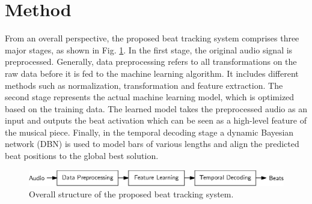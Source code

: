 \documentclass{scrartcl}
\begin{document}




\newpage


\section{Method}
\label{sec:method}

From an overall perspective, the proposed beat tracking system comprises three major stages, as shown in Fig. \ref{fig:system}. In the first stage, the original audio signal is preprocessed. Generally, data preprocessing refers to all transformations on the raw data before it is fed to the machine learning algorithm. It includes different methods such as normalization, transformation and feature extraction. The second stage represents the actual machine learning model, which is optimized based on the  training data. The learned model takes the preprocessed audio as an input and outputs the beat activation which can be seen as a high-level feature of the musical piece. Finally, in the temporal decoding stage a dynamic Bayesian network (DBN) is used to model bars of various lengths and align the predicted beat positions to the global best solution.  
\begin{figure}[htbp]
\centering
\includegraphics[scale=1.0,trim={0 0 0 -0.5em}]{figures/beat_tracking_system.eps}
\caption{Overall structure of the proposed beat tracking system.}
\label{fig:system}
\end{figure}  
\end{document}
